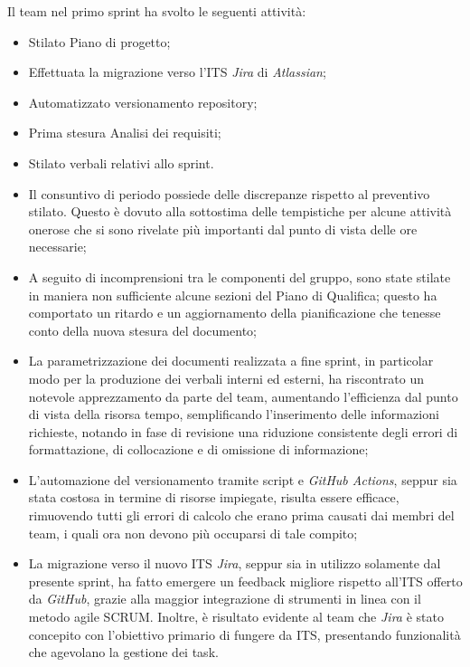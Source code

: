 \documentclass[10pt, a4paper]{article}
\begin{document}
{{{{{{{{{{{{{{{{{
Il team nel primo sprint ha svolto le seguenti attività:
\begin{itemize}
    \item Stilato Piano di progetto;
    \item Effettuata la migrazione verso l'ITS \textit{Jira} di \textit{Atlassian};
    \item Automatizzato versionamento repository;
    \item Prima stesura Analisi dei requisiti;
    \item Stilato verbali relativi allo sprint.
\end{itemize}
\begin{itemize}
\item Il consuntivo di periodo possiede delle discrepanze rispetto al preventivo stilato. Questo è dovuto alla sottostima delle 
tempistiche per alcune attività onerose che si sono rivelate più importanti dal punto di vista delle ore necessarie;
\item A seguito di incomprensioni tra le componenti del gruppo, sono state stilate in maniera non sufficiente alcune sezioni del 
Piano di Qualifica; questo ha comportato un ritardo e un aggiornamento della pianificazione che tenesse conto della nuova stesura del documento;
\item La parametrizzazione dei documenti realizzata a fine sprint, in particolar modo per la produzione dei verbali interni ed esterni, ha riscontrato un notevole apprezzamento
da parte del team, aumentando l'efficienza dal punto di vista della risorsa tempo, semplificando l'inserimento delle informazioni richieste, notando
in fase di revisione una riduzione consistente degli errori di formattazione, di collocazione e di omissione di informazione;
\item L'automazione del versionamento tramite script e \textit{GitHub Actions}, seppur sia stata costosa in termine di risorse impiegate,
risulta essere efficace, rimuovendo tutti gli errori di calcolo che erano prima causati dai membri del team, i quali ora non devono più occuparsi di tale compito;
\item La migrazione verso il nuovo ITS \textit{Jira}, seppur sia in utilizzo solamente dal presente sprint, ha fatto emergere un feedback migliore rispetto all'ITS 
offerto da \textit{GitHub}, grazie alla maggior integrazione di strumenti in linea con il metodo agile SCRUM. Inoltre, è risultato evidente al team che \textit{Jira} è stato concepito 
con l'obiettivo primario di fungere da ITS, presentando funzionalità che agevolano la gestione dei task.
\end{itemize}
}}}}}}}}}}}}}}}}}
\end{document}
